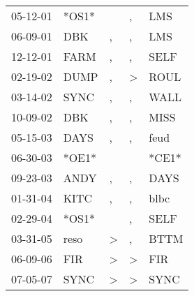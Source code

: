 \begin{supertabular}{lllll}
 05-12-01 &  *OS1* &               &             , &    LMS \\
 06-09-01 &    DBK &             , &             , &    LMS \\
 12-12-01 &   FARM &             , &             , &   SELF \\
 02-19-02 &   DUMP &             , &  \textgreater &   ROUL \\
 03-14-02 &   SYNC &             , &             , &   WALL \\
 10-09-02 &    DBK &             , &             , &   MISS \\
 05-15-03 &   DAYS &             , &             , &   feud \\
 06-30-03 &  *OE1* &               &               &  *CE1* \\
 09-23-03 &   ANDY &             , &             , &   DAYS \\
 01-31-04 &   KITC &             , &             , &   blbc \\
 02-29-04 &  *OS1* &               &             , &   SELF \\
 03-31-05 &   reso &  \textgreater &             , &   BTTM \\
 06-09-06 &    FIR &  \textgreater &  \textgreater &    FIR \\
 07-05-07 &   SYNC &  \textgreater &  \textgreater &   SYNC \\
\end{supertabular}
